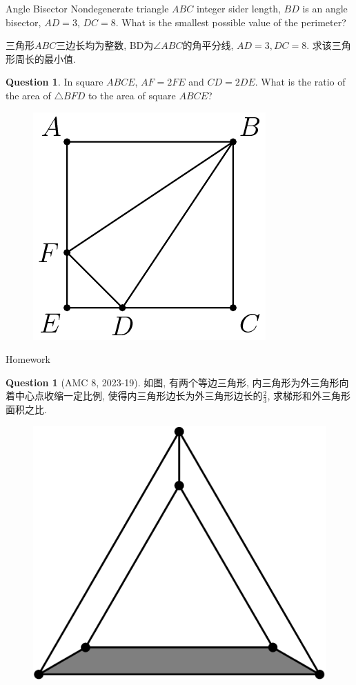 \documentclass{beamer}
\theoremstyle{definition}
\newtheorem{ques}[defn]{Question}
\begin{document}
\begin{frame}{Angle Bisector}
    Nondegenerate triangle $ABC$ integer sider length, $BD$ is an angle bisector, $AD=3$, $DC=8$. What is
    the smallest possible value of the perimeter?

    三角形$ABC$三边长均为整数, BD为$\angle ABC$的角平分线, $AD=3,DC=8$. 求该三角形周长的最小值.
\end{frame}
\begin{frame}
    \begin{ques}
        In square $ABCE$, $AF=2FE$ and $CD=2DE$. What is the ratio of the area of $\triangle BFD$ to the area of square $ABCE$?
    \end{ques}
    \begin{figure}
        \includegraphics[height=0.4\textheight]{triangle5.png}
    \end{figure}
\end{frame}
\begin{frame}{Homework}
    \begin{ques}[AMC 8, 2023-19]
        如图, 有两个等边三角形, 内三角形为外三角形向着中心点收缩一定比例, 使得内三角形边长为外三角形边长的$\frac{2}{3}$, 求梯形和外三角形面积之比.
        \begin{figure}
            \includegraphics[height=0.4\textheight]{triangle1.png}
        \end{figure}
    \end{ques}
\end{frame}
\end{document}
